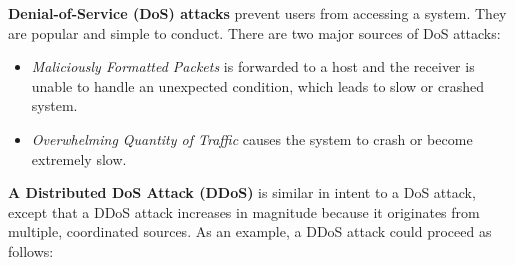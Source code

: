 %

\textbf{Denial-of-Service (DoS) attacks} prevent users from accessing a system. They are popular and simple to conduct. There are two major sources of DoS attacks:

\begin{itemize}
\item \emph{Maliciously Formatted Packets} is forwarded to a host and the receiver is unable to handle an unexpected condition, which leads to slow or crashed system.
\item \emph{Overwhelming Quantity of Traffic} causes the system to crash or become extremely slow.
\end{itemize}

\textbf{A Distributed DoS Attack (DDoS)} is similar in intent to a DoS attack, except that a DDoS attack increases in magnitude because it originates from multiple, coordinated sources. As an example, a DDoS attack could proceed as follows:

